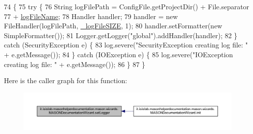 \begin{DoxyCode}
74                              \{
75         \textcolor{keywordflow}{try} \{
76             String logFilePath = ConfigFile.getProjectDir() + File.separator
77                     + \hyperlink{classit_1_1isislab_1_1masonhelperdocumentation_1_1mason_1_1wizards_1_1_m_a_s_o_n_documentation_wizard_a8cff8f361185fdae7ef6d181e2bef353}{logFileName};
78             Handler handler;
79             handler = \textcolor{keyword}{new} FileHandler(logFilePath, \hyperlink{classit_1_1isislab_1_1masonhelperdocumentation_1_1mason_1_1wizards_1_1_m_a_s_o_n_documentation_wizard_aceaf93376094874691a1eb188e8b3185}{\_logFileSIZE}, 1);
80             handler.setFormatter(\textcolor{keyword}{new} SimpleFormatter());
81             Logger.getLogger(\textcolor{stringliteral}{"global"}).addHandler(handler);
82         \} \textcolor{keywordflow}{catch} (SecurityException e) \{
83             log.severe(\textcolor{stringliteral}{"SecurityException creating log file: "} + e.getMessage());
84         \} \textcolor{keywordflow}{catch} (IOException e) \{
85             log.severe(\textcolor{stringliteral}{"IOException creating log file: "} + e.getMessage());
86         \}
87     \}
\end{DoxyCode}


Here is the caller graph for this function\-:\nopagebreak
\begin{figure}[H]
\begin{center}
\leavevmode
\includegraphics[width=350pt]{classit_1_1isislab_1_1masonhelperdocumentation_1_1mason_1_1wizards_1_1_m_a_s_o_n_documentation_wizard_af1edd4add23bbf210945e1506c9ce018_icgraph}
\end{center}
\end{figure}




